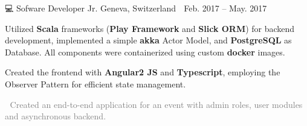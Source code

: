 \documentclass{awesome-cv}
\newcommand{\hll}[1]{\noindent\colorbox{light-gray}{\parbox{17.5cm}{\textcolor{gray}{#1}}}}
\begin{document}
{\begin{cventries}

        {💻 Sofware Developer Jr.} %
        {Geneva, Switzerland 📍} %
        {Feb. 2017 – May. 2017 📆} %
        {\begin{cvitems}
                \item {Utilized \textbf{Scala} frameworks (\textbf{Play\! Framework} and \textbf{Slick ORM}) for backend development, implemented a simple \textbf{akka} Actor Model, and \textbf{PostgreSQL} as Database. All components were containerized using custom \textbf{docker} images.}
                \item {Created the frontend with \textbf{Angular2 JS} and \textbf{Typescript}, employing the Observer Pattern for efficient state management.}
                \\
                \newline
                \hll{🎯 Created an end-to-end application for an event with admin roles, user modules and asynchronous backend.}
            \end{cvitems}
        }

    \end{cventries}
}
    

    
\end{document}
